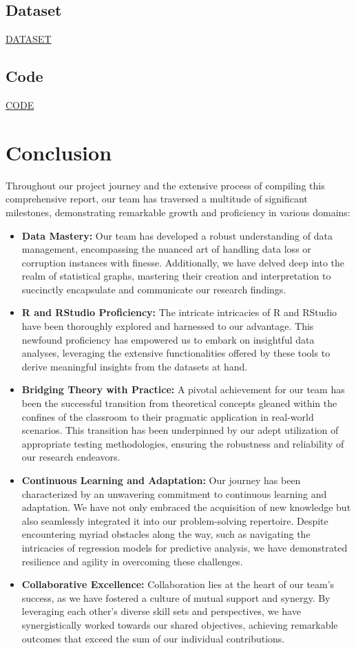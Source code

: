 \documentclass[a4paper]{article}
\theoremstyle{definition}
\begin{document}
\subsection{Dataset}
\href{https://www.kaggle.com/datasets/iliassekkaf/computerparts/data?select=All_GPUs.csv}{DATASET}
\subsection{Code}
\href{https://github.com/NhtJm/GR09-03}{CODE}
\section{Conclusion}
Throughout our project journey and the extensive process of compiling this comprehensive report, our team has traversed a multitude of significant milestones, demonstrating remarkable growth and proficiency in various domains:
\begin{itemize}
    \item \textbf{Data Mastery:}
    Our team has developed a robust understanding of data management, encompassing the nuanced art of handling data loss or corruption instances with finesse. Additionally, we have delved deep into the realm of statistical graphs, mastering their creation and interpretation to succinctly encapsulate and communicate our research findings.
    \item \textbf{R and RStudio Proficiency:}
    The intricate intricacies of R and RStudio have been thoroughly explored and harnessed to our advantage. This newfound proficiency has empowered us to embark on insightful data analyses, leveraging the extensive functionalities offered by these tools to derive meaningful insights from the datasets at hand. 
    \item \textbf{Bridging Theory with Practice:}
    A pivotal achievement for our team has been the successful transition from theoretical concepts gleaned within the confines of the classroom to their pragmatic application in real-world scenarios. This transition has been underpinned by our adept utilization of appropriate testing methodologies, ensuring the robustness and reliability of our research endeavors.
    \item \textbf{Continuous Learning and Adaptation:}
    Our journey has been characterized by an unwavering commitment to continuous learning and adaptation. We have not only embraced the acquisition of new knowledge but also seamlessly integrated it into our problem-solving repertoire. Despite encountering myriad obstacles along the way, such as navigating the intricacies of regression models for predictive analysis, we have demonstrated resilience and agility in overcoming these challenges.
    \item \textbf{Collaborative Excellence:}
    Collaboration lies at the heart of our team's success, as we have fostered a culture of mutual support and synergy. By leveraging each other's diverse skill sets and perspectives, we have synergistically worked towards our shared objectives, achieving remarkable outcomes that exceed the sum of our individual contributions.
\end{itemize}
\end{document}
